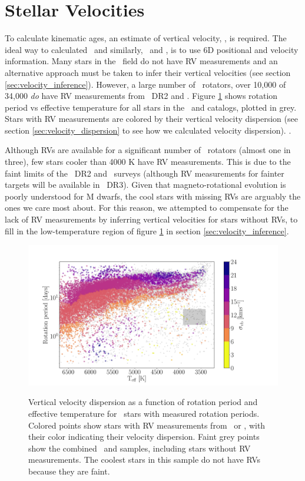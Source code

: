 \section{Stellar Velocities}
\label{sec:velocities}

To calculate kinematic ages, an estimate of vertical velocity, \vz, is
required.
The ideal way to calculated \vz\, and similarly, \vx\ and \vy, is to use 6D
positional and velocity information.
Many stars in the \kepler\ field do not have RV measurements and an
alternative approach must be taken to infer their vertical velocities (see
section \ref{sec:velocity_inference}).
However, a large number of \kepler\ rotators, over 10,000 of 34,000 {\it do}
have RV measurements from \gaia\ DR2 and \lamost.
Figure \ref{fig:existing_rvs} shows rotation period vs effective temperature
for all stars in the \mct\ and \citet{santos2019} catalogs, plotted in grey.
Stars with RV measurements are colored by their vertical velocity dispersion
(see section \ref{sec:velocity_dispersion} to see how we calculated velocity
dispersion).
.

Although RVs are available for a significant number of \kepler\ rotators
(almost one in three), few stars cooler than 4000 K have RV measurements.
This is due to the faint limits of the \gaia\ DR2 and \lamost\ surveys
(although RV measurements for fainter targets will be available in \gaia\
DR3).
Given that magneto-rotational evolution is poorly understood for M dwarfs, the
cool stars with missing RVs are arguably the ones we care most about.
For this reason, we attempted to compensate for the lack of RV measurements by
inferring vertical velocities for stars without RVs, to fill in the
low-temperature region of figure \ref{fig:existing_rvs} in section
\ref{sec:velocity_inference}.
\begin{figure}[ht!]
\caption{
Vertical velocity dispersion as a function of rotation period and effective
    temperature for \kepler\ stars with measured rotation periods.
Colored points show stars with RV measurements from \gaia\ or \lamost, with
    their color indicating their velocity dispersion.
Faint grey points show the combined \mct\ and \citet{santos2019} samples,
    including stars without RV measurements.
The coolest stars in this sample do not have RVs because they are faint.
}
  \centering \includegraphics[width=1\textwidth]{existing_rvs}
\label{fig:existing_rvs}
\end{figure}


